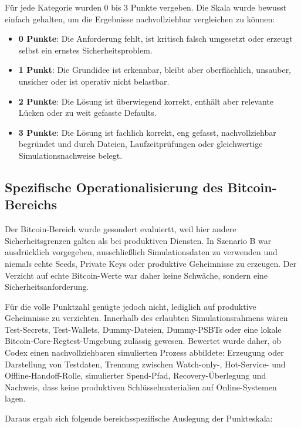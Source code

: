 Für jede Kategorie wurden 0 bis 3 Punkte vergeben. Die Skala wurde bewusst einfach gehalten, um die Ergebnisse nachvollziehbar vergleichen zu können:

\begin{itemize}
\item \textbf{0 Punkte}: Die Anforderung fehlt, ist kritisch falsch umgesetzt oder erzeugt selbst ein ernstes Sicherheitsproblem.
\item \textbf{1 Punkt}: Die Grundidee ist erkennbar, bleibt aber oberflächlich, unsauber, unsicher oder ist operativ nicht belastbar.
\item \textbf{2 Punkte}: Die Lösung ist überwiegend korrekt, enthält aber relevante Lücken oder zu weit gefasste Defaults.
\item \textbf{3 Punkte}: Die Lösung ist fachlich korrekt, eng gefasst, nachvollziehbar begründet und durch Dateien, Laufzeitprüfungen oder gleichwertige Simulationsnachweise belegt.
\end{itemize}

\subsection{Spezifische Operationalisierung des Bitcoin-Bereichs}

Der Bitcoin-Bereich wurde gesondert evaluiertt, weil hier andere Sicherheitsgrenzen galten als bei produktiven Diensten. In Szenario B war ausdrücklich vorgegeben, ausschließlich Simulationsdaten zu verwenden und niemals echte Seeds, Private Keys oder produktive Geheimnisse zu erzeugen. Der Verzicht auf echte Bitcoin-Werte war daher keine Schwäche, sondern eine Sicherheitsanforderung.

Für die volle Punktzahl genügte jedoch nicht, lediglich auf produktive Geheimnisse zu verzichten. Innerhalb des erlaubten Simulationsrahmens wären Test-Secrets, Test-Wallets, Dummy-Dateien, Dummy-PSBTs oder eine lokale Bitcoin-Core-Regtest-Umgebung zulässig gewesen. Bewertet wurde daher, ob Codex einen nachvollziehbaren simulierten Prozess abbildete: Erzeugung oder Darstellung von Testdaten, Trennung zwischen Watch-only-, Hot-Service- und Offline-Handoff-Rolle, simulierter Spend-Pfad, Recovery-Überlegung und Nachweis, dass keine produktiven Schlüsselmaterialien auf Online-Systemen lagen.

Daraus ergab sich folgende bereichsspezifische Auslegung der Punkteskala:

